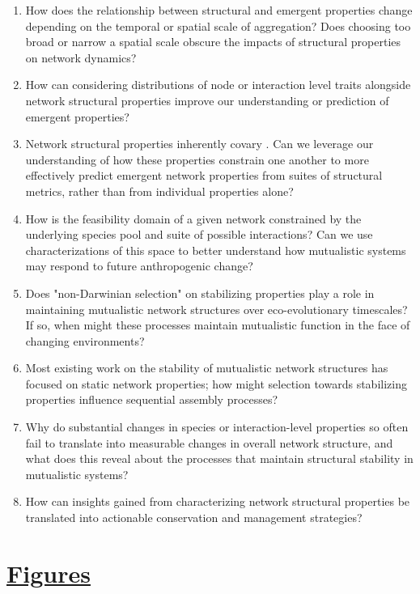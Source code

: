 \begin{enumerate}
    \item How does the relationship between structural and emergent properties change depending on the temporal or spatial scale of aggregation? Does choosing too broad or narrow a spatial scale obscure the impacts of structural properties on network dynamics? 
    \item How can considering distributions of node or interaction level traits alongside network structural properties improve our understanding or prediction of emergent properties? 
    \item Network structural properties inherently covary \parencite{poisot2014ecological, pellissier2018comparing}. Can we leverage our understanding of how these properties constrain one another to more effectively predict emergent network properties from suites of structural metrics, rather than from individual properties alone?
    \item How is the feasibility domain of a given network \parencite{bascompte2022resilience} constrained by the underlying species pool and suite of possible interactions? Can we use characterizations of this space to better understand how mutualistic systems may respond to future anthropogenic change? 
    \item Does "non-Darwinian selection" \parencite{borrelli2015selection, saravia2022ecological} on stabilizing properties play a role in maintaining mutualistic network structures over eco-evolutionary timescales? If so, when might these processes maintain mutualistic function in the face of changing environments? 
    \item Most existing work on the stability of mutualistic network structures has focused on static network properties; how might selection towards stabilizing properties influence sequential assembly processes? 
    \item Why do substantial changes in species or interaction-level properties so often fail to translate into measurable changes in overall network structure, and what does this reveal about the processes that maintain structural stability in mutualistic systems?
    \item How can insights gained from characterizing network structural properties be translated into actionable conservation and management strategies?
\end{enumerate}

\clearpage
\section*{\textbf{\underline{Figures}}}

